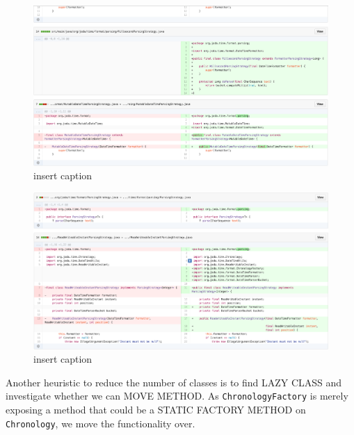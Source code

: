 \begin{figure}[H]
	\centering
	\includegraphics[width=\linewidth]{code120}
	\caption{insert caption}
\end{figure}
\begin{figure}[H]
	\centering
	\includegraphics[width=\linewidth]{code121}
	\caption{insert caption}
\end{figure}

Another heuristic to reduce the number of classes is to find LAZY CLASS and investigate whether we can MOVE METHOD. As \texttt{ChronologyFactory} is merely exposing a method that could be a STATIC FACTORY METHOD on \texttt{Chronology}, we move the functionality over.


